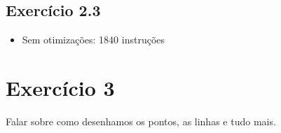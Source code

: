 \documentclass[12pt, a4paper, twoside]{article}
\begin{document}
\subsection{Exercício 2.3}


\begin{itemize}
    \item Sem otimizações: 1840 instruções
\end{itemize}

\section{Exercício 3}

Falar sobre como desenhamos os pontos, as linhas e tudo mais.
\end{document}

